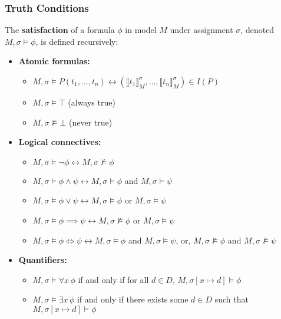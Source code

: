 \subsubsection{Truth Conditions}
The \textbf{satisfaction} of a formula \(\phi\) in model \(M\) under assignment \(\sigma\), denoted \(M, \sigma \models \phi\), is defined recursively:

\begin{itemize}
  \item \textbf{Atomic formulas:}
  \begin{itemize}
    \item \(M, \sigma \models P(t_1, \ldots, t_n) \leftrightarrow (\llbracket t_1 \rrbracket_M^\sigma, \ldots, \llbracket t_n \rrbracket_M^\sigma) \in I(P)\)
    \item \(M, \sigma \models \top\) (always true)
    \item \(M, \sigma \not\models \bot\) (never true)
  \end{itemize}
  
  \item \textbf{Logical connectives:}
  \begin{itemize}
    \item \(M, \sigma \models \neg \phi \leftrightarrow M, \sigma \not\models \phi\)
    \item \(M, \sigma \models \phi \land \psi \leftrightarrow M, \sigma \models \phi\) and \(M, \sigma \models \psi\)
    \item \(M, \sigma \models \phi \lor \psi \leftrightarrow M, \sigma \models \phi\) or \(M, \sigma \models \psi\)
    \item \(M, \sigma \models \phi \implies \psi \leftrightarrow M, \sigma \not\models \phi\) or \(M, \sigma \models \psi\)
    \item \(M, \sigma \models \phi \iff \psi \leftrightarrow M, \sigma \models \phi \) and \( M, \sigma \models \psi\), or, \(M, \sigma \not\models \phi \) and \( M, \sigma \not\models \psi\)
  \end{itemize}
  
  \item \textbf{Quantifiers:}
  \begin{itemize}
    \item \(M, \sigma \models \forall x \, \phi\) if and only if for all \(d \in D\), \(M, \sigma[x \mapsto d] \models \phi\)
    \item \(M, \sigma \models \exists x \, \phi\) if and only if there exists some \(d \in D\) such that \(M, \sigma[x \mapsto d] \models \phi\)
  \end{itemize}
\end{itemize}

